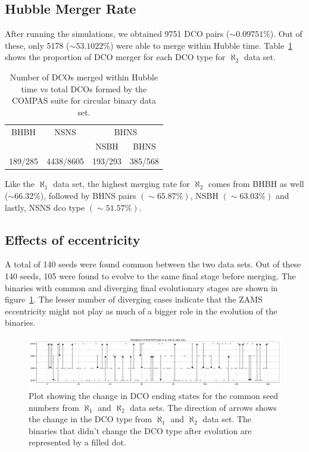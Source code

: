 \documentclass[journal, twocolumn]{IEEEtran}
\begin{document}
    \subsection{Hubble Merger Rate} 
    After running the simulations, we obtained 9751 DCO pairs ($\sim0.09751\%$). Out of these, only 5178 ($\sim53.1022\%$) were able to merge within Hubble time. Table~\ref{tab:dco_details0e} shows the proportion of DCO merger for each DCO type for $\aleph_2$ data set.
    
    \begin{table}[!h]%
		\centering
		\begin{tabular}{@{}cccc@{}}
			\toprule
			\multirow{2.5}{*}{BHBH} & \multirow{2.5}{*}{NSNS} & \multicolumn{2}{c}{BHNS} \\ \cmidrule(l){3-4}
			&           & NSBH    & BHNS     \\ \midrule
			189/285 & 4438/8605 & 193/293 & 385/568 \\ \bottomrule
		\end{tabular}%
		\caption{Number of DCOs merged within Hubble time vs total DCOs formed by the COMPAS suite for circular binary data set.}
		\label{tab:dco_details0e}
	\end{table}%
	Like the $\aleph_1$ data set, the highest merging rate for $\aleph_2$ comes from BHBH as well ($\sim66.32\%$), followed by BHNS pairs $(\sim65.87\%)$, NSBH $(\sim63.03\%)$ and lastly, NSNS dco type $(\sim51.57\%)$.

	\subsection{Effects of eccentricity}
    \label{subsec:effects-of-eccentricity}
    A total of 140 seeds were found common between the two data sets.
    Out of these 140 seeds, 105 were found to evolve to the same final stage before merging.
    The binaries with common and diverging final evolutionary stages are shown in figure~\ref{fig:dcotypedivergenceintwodatasets}.
    The lesser number of diverging cases indicate that the ZAMS eccentricity might not play as much of a bigger role in the evolution of the binaries.
    
    \begin{figure}[!h]%
    	\centering
    	\includegraphics[width=\textwidth]{analysis_data/dcotype_divergence_in_two_datasets}
    	\caption{Plot showing the change in DCO ending states for the common seed numbers from $\aleph_1$ and $\aleph_2$ data sets. The direction of arrows shows the change in the DCO type from $\aleph_1$ and $\aleph_2$ data set. The binaries that didn't change the DCO type after evolution are represented by a filled dot.}
    	\label{fig:dcotypedivergenceintwodatasets}
    \end{figure}%
    
\end{document}
